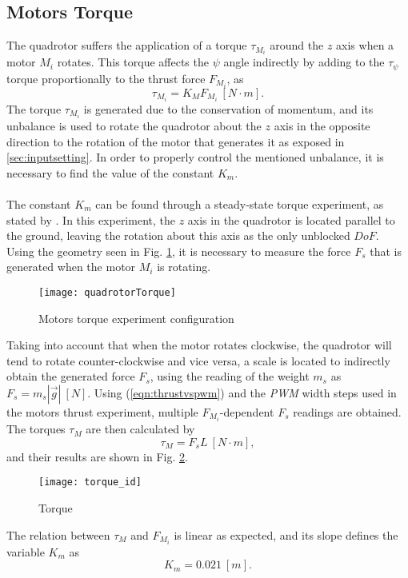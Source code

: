 \subsection{Motors Torque}
The quadrotor suffers the application of a torque $\tau_{M_{i}}$ around the $z$ axis when a motor $M_i$ rotates. This torque affects the $\psi$ angle indirectly by adding to the $\tau_\psi$ torque proportionally to the thrust force $F_{M_i}$, as
\begin{equation}
\tau_{M_{i}} = K_{M}F_{M_i}\ [N\cdot m].
\end{equation}
The torque $\tau_{M_{i}}$ is generated due to the conservation of momentum, and its unbalance is used to rotate the quadrotor about the $z$ axis in the opposite direction to the rotation of the motor that generates it as exposed in \ref{sec:inputsetting}. In order to properly control the mentioned unbalance, it is necessary to find the value of the constant $K_m$.
\\\\
The constant $K_{m}$ can be found through a steady-state torque experiment, as stated by \cite{Oliveira2012}. In this experiment, the $z$ axis in the quadrotor is located parallel to the ground, leaving the rotation about this axis as the only unblocked $DoF$. Using the geometry seen in Fig. \ref{fig:quadrotortorque}, it is necessary to measure the force $F_s$ that is generated when the motor $M_i$ is rotating.
\begin{figure}[H]
	\begin{center}
		\texttt{[image: quadrotorTorque]}    
		\caption{Motors torque experiment configuration} 
		\label{fig:quadrotortorque}
	\end{center}
\end{figure}
Taking into account that when the motor rotates clockwise, the quadrotor will tend to rotate counter-clockwise and vice versa, a scale is located to indirectly obtain the generated force $F_{s}$, using the reading of the weight $m_s$ as $F_{s} = m_{s}|\vec{g}|\ [N]$. Using (\ref{eqn:thrustvspwm}) and the \textit{PWM} width steps used in the motors thrust experiment, multiple $F_{M_i}$-dependent $F_s$ readings are obtained. The torques $\tau_M$ are then calculated by
\begin{equation}
\tau_{M} = F_{s}L\ [N\cdot m],
\end{equation}
and their results are shown in Fig. \ref{fig:torque_id}.
\begin{figure}[H]
	\begin{center}
		\texttt{[image: torque\_id]}    
		\caption{Torque} 
		\label{fig:torque_id}
	\end{center}
\end{figure}
The relation between $\tau_M$ and $F_{M_i}$ is linear as expected, and its slope defines the variable $K_m$ as
\begin{equation}
K_{m} = 0.021\ [m].
\end{equation}


